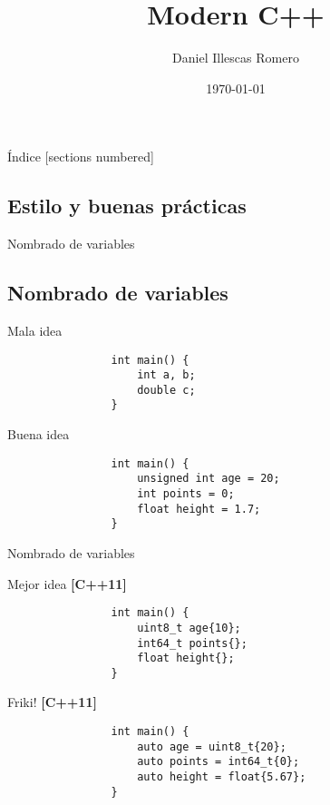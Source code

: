 \documentclass{beamer}
\title{Modern C++}
\author{Daniel Illescas Romero}
\date{\today}
\institute{Universidad de Granada [UGR]}
\newcommand{\normalSizeItem}[1] {
  \normalsize{\item #1}
}
\newcommand{\newFrameWithoutIndex}[1]{
	\begin{frame}
		#1
		\thispagestyle{empty}
	\end{frame}
}
\newcommand{\newSectionWithoutIndex}[1]{
	\newFrameWithoutIndex{\section{#1}}
}
\begin{document}
	\newFrameWithoutIndex{\maketitle}
	
	\begin{frame}{Índice}		
		[sections numbered]
		\tableofcontents
	\end{frame}

	\newSectionWithoutIndex{Estilo y buenas prácticas}
  
		\begin{frame}[fragile]{Nombrado de variables}	
			\subsection{Nombrado de variables}
			\begin{itemize}
			
				\normalSizeItem {Mala idea}
				\begin{lstlisting}
				int main() {
					int a, b;
					double c;
				}
				\end{lstlisting}
				
				\normalSizeItem {Buena idea}
				\begin{lstlisting}
				int main() {
					unsigned int age = 20;
					int points = 0;
					float height = 1.7;
				}
				\end{lstlisting}
				
			\end{itemize}
		\end{frame}
			 
		\begin{frame}[fragile]{Nombrado de variables}	
			\begin{itemize}
			
				\normalSizeItem{Mejor idea \textbf{[C++11]}}
				\begin{lstlisting}
				int main() {
					uint8_t age{10};
					int64_t points{}; 
					float height{};
				}
				\end{lstlisting}
				
				\normalSizeItem{Friki! \textbf{[C++11]}}
				\begin{lstlisting}
				int main() {
					auto age = uint8_t{20};
					auto points = int64_t{0};
					auto height = float{5.67};
				}
				\end{lstlisting}
				
			\end{itemize}
		\end{frame}
		
\end{document}
